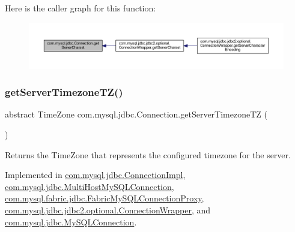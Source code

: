 Here is the caller graph for this function\+:\nopagebreak
\begin{figure}[H]
\begin{center}
\leavevmode
\includegraphics[width=350pt]{interfacecom_1_1mysql_1_1jdbc_1_1_connection_a1831e47e0daa7d5a4b362219105a85ec_icgraph}
\end{center}
\end{figure}
\mbox{\label{interfacecom_1_1mysql_1_1jdbc_1_1_connection_aa824ea2a868be95bd6a21119445838b8}} 
\subsubsection{\texorpdfstring{get\+Server\+Timezone\+T\+Z()}{getServerTimezoneTZ()}}
{\footnotesize\ttfamily abstract Time\+Zone com.\+mysql.\+jdbc.\+Connection.\+get\+Server\+Timezone\+TZ (\begin{DoxyParamCaption}{ }\end{DoxyParamCaption})\hspace{0.3cm}{\ttfamily [abstract]}}

Returns the Time\+Zone that represents the configured timezone for the server. 

Implemented in \mbox{\hyperlink{classcom_1_1mysql_1_1jdbc_1_1_connection_impl_ac1fa3018d7b3c139355f45e55f37fd15}{com.\+mysql.\+jdbc.\+Connection\+Impl}}, \mbox{\hyperlink{classcom_1_1mysql_1_1jdbc_1_1_multi_host_my_s_q_l_connection_a6cd4e5250d8940bbbfeb6d5a4a4efb45}{com.\+mysql.\+jdbc.\+Multi\+Host\+My\+S\+Q\+L\+Connection}}, \mbox{\hyperlink{classcom_1_1mysql_1_1fabric_1_1jdbc_1_1_fabric_my_s_q_l_connection_proxy_aa7681c7b1a3e0e15195537b76729ad3b}{com.\+mysql.\+fabric.\+jdbc.\+Fabric\+My\+S\+Q\+L\+Connection\+Proxy}}, \mbox{\hyperlink{classcom_1_1mysql_1_1jdbc_1_1jdbc2_1_1optional_1_1_connection_wrapper_a2c40120ec4b0435a9e26955ee5d82c0d}{com.\+mysql.\+jdbc.\+jdbc2.\+optional.\+Connection\+Wrapper}}, and \mbox{\hyperlink{interfacecom_1_1mysql_1_1jdbc_1_1_my_s_q_l_connection_a28586f911062106cb730733427568fc7}{com.\+mysql.\+jdbc.\+My\+S\+Q\+L\+Connection}}.

